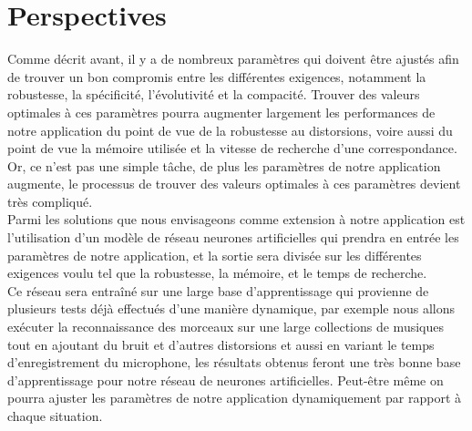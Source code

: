 \documentclass[11pt, report, french]{scrreprt}
\begin{document}
\chapter{Perspectives}
Comme décrit avant, il y a de nombreux paramètres qui doivent être ajustés afin de trouver un bon compromis entre les différentes exigences, notamment la robustesse, la spécificité, l'évolutivité et la compacité. Trouver des valeurs optimales à ces paramètres pourra augmenter largement les performances de notre application du point de vue de la robustesse au distorsions, voire aussi du point de vue la mémoire utilisée et la vitesse de recherche d'une correspondance. Or, ce n'est pas une simple tâche, de plus les paramètres de notre application augmente, le processus de trouver des valeurs optimales à ces paramètres devient très compliqué.\\

Parmi les solutions que nous envisageons comme extension à notre application est l'utilisation d'un modèle de réseau neurones artificielles qui prendra en entrée les paramètres de notre application, et la sortie sera divisée sur les différentes exigences voulu tel que la robustesse, la mémoire, et le temps de recherche.\\

Ce réseau sera entraîné sur une large base d'apprentissage qui provienne de plusieurs tests déjà effectués d'une manière dynamique, par exemple nous allons exécuter la reconnaissance des morceaux sur une large collections de musiques tout en ajoutant du bruit et d'autres distorsions et aussi en variant le temps d'enregistrement du microphone, les résultats obtenus feront une très bonne base d'apprentissage pour notre réseau de neurones artificielles. Peut-être même on pourra ajuster les paramètres de notre application dynamiquement par rapport à chaque situation.\\
\end{document}
